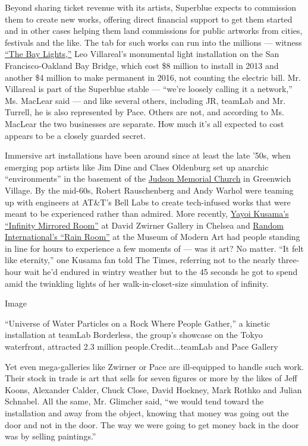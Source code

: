 Beyond sharing ticket revenue with its artists, Superblue expects to
commission them to create new works, offering direct financial support
to get them started and in other cases helping them land commissions for
public artworks from cities, festivals and the like. The tab for such
works can run into the millions --- witness
\href{https://illuminate.org/projects/the-bay-lights/}{``The Bay
Lights,''} Leo Villareal's monumental light installation on the San
Francisco-Oakland Bay Bridge, which cost \$8 million to install in 2013
and another \$4 million to make permanent in 2016, not counting the
electric bill. Mr. Villareal is part of the Superblue stable --- ``we're
loosely calling it a network,'' Ms. MacLear said --- and like several
others, including JR, teamLab and Mr. Turrell, he is also represented by
Pace. Others are not, and according to Ms. MacLear the two businesses
are separate. How much it's all expected to cost appears to be a closely
guarded secret.

Immersive art installations have been around since at least the late
'50s, when emerging pop artists like Jim Dine and Claes Oldenburg set up
anarchic ``environments'' in the basement of the
\href{https://www.judson.org/arts}{Judson Memorial Church} in Greenwich
Village. By the mid-60s, Robert Rauschenberg and Andy Warhol were
teaming up with engineers at AT\&T's Bell Labs to create tech-infused
works that were meant to be experienced rather than admired. More
recently,
\href{https://www.nytimes.com/2013/12/02/arts/design/yayoi-kusamas-mirrored-room-at-david-zwirner-gallery.html}{Yayoi
Kusama's ``Infinity Mirrored Room''} at David Zwirner Gallery in Chelsea
and
\href{https://www.nytimes.com/video/arts/design/100000002254021/rain-room-at-the-barbican-center.html}{Random
International's ``Rain Room''} at the Museum of Modern Art had people
standing in line for hours to experience a few moments of --- was it
art? No matter. ``It felt like eternity,'' one Kusama fan told The
Times, referring not to the nearly three-hour wait he'd endured in
wintry weather but to the 45 seconds he got to spend amid the twinkling
lights of her walk-in-closet-size simulation of infinity.

Image

``Universe of Water Particles on a Rock Where People Gather,'' a kinetic
installation at teamLab Borderless, the group's showcase on the Tokyo
waterfront, attracted 2.3 million people.Credit...teamLab and Pace
Gallery

Yet even mega-galleries like Zwirner or Pace are ill-equipped to handle
such work. Their stock in trade is art that sells for seven figures or
more by the likes of Jeff Koons, Alexander Calder, Chuck Close, David
Hockney, Mark Rothko and Julian Schnabel. All the same, Mr. Glimcher
said, ``we would tend toward the installation and away from the object,
knowing that money was going out the door and not in the door. The way
we were going to get money back in the door was by selling paintings.''

